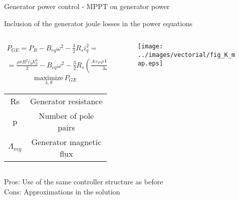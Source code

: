 \begin{frame}{Generator power control - MPPT on generator power}

  Inclusion of the generator joule losses in the power equations
  

  \begin{columns}
    \begin{column}{0.4\columnwidth}
      { \tiny
      \begin{gather*}
          P_{GE} = P_R - B_{eq}\omega^2 - \frac{3}{2} R_s i_q^2 =\\
        =\frac{\rho\pi R^2c_PV_0^3}{2} - B_{eq}\omega^2-\frac{3}{2}R_s\left(\frac{A \, c_P \, \rho \, V_0^3 \,-\,2B_{eq}{\omega}^2}{3\omega\,p\,\Lambda_{mg}}\right)^2 
      \end{gather*}
      }
      \begin{equation*}
        \underset{\lambda, \theta}{\text{maximize}} \, P_{GE}
      \end{equation*}
      
      \begin{table}
        \begin{tabular}{cc}
          \toprule
          Rs & Generator resistance\\
          p & Number of pole pairs\\
          $\Lambda_{mg}$ & Generator magnetic flux\\
          \bottomrule
        \end{tabular}
      \end{table}
            
    \end{column}
    \begin{column}{0.6\columnwidth}
      \begin{figure}
        \centering
        \texttt{[image: ../images/vectorial/fig\_K\_map.eps]}
      \end{figure}
    \end{column}
  \end{columns}

\vspace{0.5cm}
\textcolor{yaleblue}{Pros:} Use of the same controller structure as before\\
\textcolor{bostonuniversityred}{Cons:} Approximations in the solution


\end{frame}
